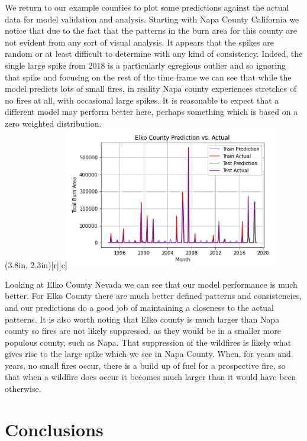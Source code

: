 \documentclass[12pt]{article}
\begin{document}
We return to our example counties to plot some predictions against the actual data for model validation and analysis. Starting with Napa County California we notice that due to the fact that the patterns in the burn area for this county are not evident from any sort of visual analysis. It appears that the spikes are random or at least difficult to determine with any kind of consistency. Indeed, the single large spike from 2018 is a particularly egregious outlier and so ignoring that spike and focusing on the rest of the time frame we can see that while the model predicts lots of small fires, in reality Napa county experiences stretches of no fires at all, with occasional large spikes. It is reasonable to expect that a different model may perform better here, perhaps something which is based on a zero weighted distribution. \\

\parpic(3.8in, 2.3in)[r][c]{\includegraphics[width=3.65in]{./img/ElkoPredPlot.png}}

Looking at Elko County Nevada we can see that our model performance is much better. For Elko County there are much better defined patterns and consistencies, and our predictions do a good job of maintaining a closeness to the actual patterns. It is also worth noting that Elko county is much larger than Napa county so fires are not likely suppressed, as they would be in a smaller more populous county, such as Napa. That suppression of the wildfires is likely what gives rise to the large spike which we see in Napa County. When, for years and years, no small fires occur, there is a build up of fuel for a prospective fire, so that when a wildfire does occur it becomes much larger than it would have been otherwise. \\


\section{\textrm{Conclusions}}
\end{document}
